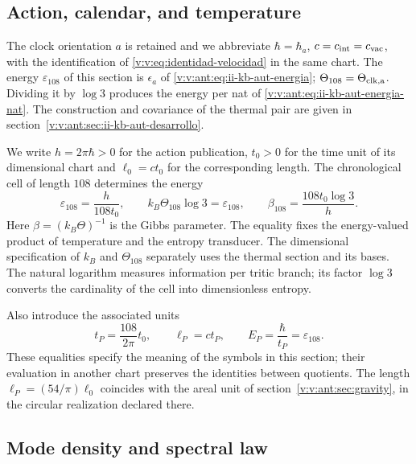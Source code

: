 

\subsection{Action, calendar, and temperature}

The clock orientation \(a\) is retained and we abbreviate
\(\hbar=\hbar_a\), \(c=c_{\rm int}=c_{\rm vac}\), with the
identification of \eqref{v:v:eq:identidad-velocidad} in the same chart.
The energy \(\varepsilon_{108}\) of this section is
\(\epsilon_a\) of \eqref{v:v:ant:eq:ii-kb-aut-energia};
\(\Theta_{108}=\Theta_{\rm clk,a}\). Dividing it by \(\log3\)
produces the energy per nat of \eqref{v:v:ant:eq:ii-kb-aut-energia-nat}.
The construction and covariance of the thermal pair are given in
section~\ref{v:v:ant:sec:ii-kb-aut-desarrollo}.

We write \(h=2\pi\hbar>0\) for the action publication, \(t_0>0\)
for the time unit of its dimensional chart and \(\ell_0=ct_0\) for
the corresponding length. The chronological cell of length \(108\)
determines the energy
\begin{equation}
 \varepsilon_{108}=\frac{h}{108t_0},\qquad
 k_B\Theta_{108}\log 3=\varepsilon_{108},\qquad
 \beta_{108}=\frac{108t_0\log3}{h}.
 \label{v:v:eq:energia-informacion-calendario}
\end{equation}
Here \(\beta=(k_B\Theta)^{-1}\) is the Gibbs parameter. The equality
fixes the energy-valued product of temperature and the entropy
transducer. The dimensional specification of \(k_B\) and
\(\Theta_{108}\) separately uses the thermal section and its bases. The natural
logarithm measures information per tritic branch; its factor \(\log3\) converts
the cardinality of the cell into dimensionless entropy.

Also introduce the associated units
\begin{equation}
 t_P=\frac{108}{2\pi}t_0,\qquad
 \ell_P=ct_P,\qquad E_P=\frac{\hbar}{t_P}
 =\varepsilon_{108}.
 \label{v:v:eq:unidades-termicas-calendario}
\end{equation}
These equalities specify the meaning of the symbols in this section;
their evaluation in another chart preserves the identities between quotients.
The length \(\ell_P=(54/\pi)\ell_0\) coincides with the areal unit
of section~\ref{v:v:ant:sec:gravity}, in the circular realization
declared there.

\subsection{Mode density and spectral law}

